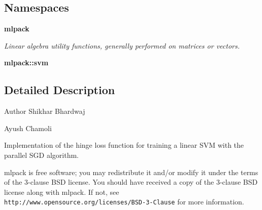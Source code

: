 \subsection*{Namespaces}
\begin{DoxyCompactItemize}
\item 
 \textbf{ mlpack}
\begin{DoxyCompactList}\small\item\em Linear algebra utility functions, generally performed on matrices or vectors. \end{DoxyCompactList}\item 
 \textbf{ mlpack\+::svm}
\end{DoxyCompactItemize}


\subsection{Detailed Description}
\begin{DoxyAuthor}{Author}
Shikhar Bhardwaj 

Ayush Chamoli
\end{DoxyAuthor}
Implementation of the hinge loss function for training a linear S\+VM with the parallel S\+GD algorithm.

mlpack is free software; you may redistribute it and/or modify it under the terms of the 3-\/clause B\+SD license. You should have received a copy of the 3-\/clause B\+SD license along with mlpack. If not, see {\tt http\+://www.\+opensource.\+org/licenses/\+B\+S\+D-\/3-\/\+Clause} for more information. 